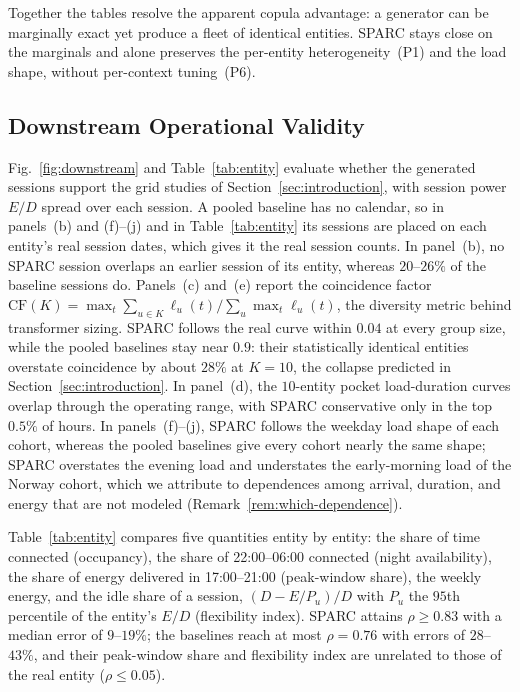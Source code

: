 \documentclass[journal]{IEEEtran}
\begin{document}
Together the tables resolve the apparent copula advantage: a generator can be marginally exact yet produce a fleet of identical entities. SPARC stays close on the marginals and alone preserves the per-entity heterogeneity~(P1) and the load shape, without per-context tuning~(P6).



\subsection{Downstream Operational Validity}
\label{subsec:downstream}

Fig.~\ref{fig:downstream} and Table~\ref{tab:entity} evaluate whether the generated sessions support the grid studies of Section~\ref{sec:introduction}, with session power $E/D$ spread over each session. A pooled baseline has no calendar, so in panels~(b) and (f)--(j) and in Table~\ref{tab:entity} its sessions are placed on each entity's real session dates, which gives it the real session counts. In panel~(b), no SPARC session overlaps an earlier session of its entity, whereas $20$--$26\%$ of the baseline sessions do. Panels~(c) and~(e) report the coincidence factor $\mathrm{CF}(K) = \max_t \sum_{u \in K} \ell_u(t) / \sum_u \max_t \ell_u(t)$, the diversity metric behind transformer sizing. SPARC follows the real curve within $0.04$ at every group size, while the pooled baselines stay near $0.9$: their statistically identical entities overstate coincidence by about $28\%$ at $K = 10$, the collapse predicted in Section~\ref{sec:introduction}. In panel~(d), the $10$-entity pocket load-duration curves overlap through the operating range, with SPARC conservative only in the top $0.5\%$ of hours. In panels~(f)--(j), SPARC follows the weekday load shape of each cohort, whereas the pooled baselines give every cohort nearly the same shape; SPARC overstates the evening load and understates the early-morning load of the Norway cohort, which we attribute to dependences among arrival, duration, and energy that are not modeled (Remark~\ref{rem:which-dependence}).

Table~\ref{tab:entity} compares five quantities entity by entity: the share of time connected (occupancy), the share of 22:00--06:00 connected (night availability), the share of energy delivered in 17:00--21:00 (peak-window share), the weekly energy, and the idle share of a session, $(D - E/P_u)/D$ with $P_u$ the $95$th percentile of the entity's $E/D$ (flexibility index). SPARC attains $\rho \geq 0.83$ with a median error of $9$--$19\%$; the baselines reach at most $\rho = 0.76$ with errors of $28$--$43\%$, and their peak-window share and flexibility index are unrelated to those of the real entity ($\rho \leq 0.05$).
\end{document}
